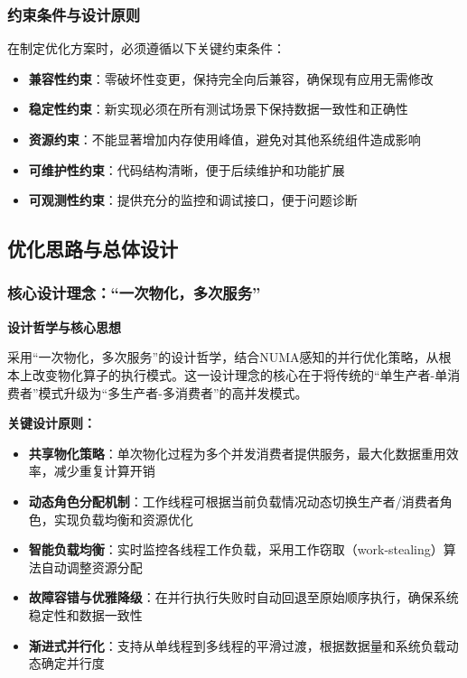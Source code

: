 \subsubsection{约束条件与设计原则}

在制定优化方案时，必须遵循以下关键约束条件：

\begin{itemize}
    \item \textbf{兼容性约束}：零破坏性变更，保持完全向后兼容，确保现有应用无需修改
    \item \textbf{稳定性约束}：新实现必须在所有测试场景下保持数据一致性和正确性
    \item \textbf{资源约束}：不能显著增加内存使用峰值，避免对其他系统组件造成影响
    \item \textbf{可维护性约束}：代码结构清晰，便于后续维护和功能扩展
    \item \textbf{可观测性约束}：提供充分的监控和调试接口，便于问题诊断
\end{itemize}

\subsection{优化思路与总体设计}

\subsubsection{核心设计理念：“一次物化，多次服务”}

\textbf{设计哲学与核心思想}

采用“一次物化，多次服务”的设计哲学，结合NUMA感知的并行优化策略\cite{numa2020optimization}，从根本上改变物化算子的执行模式。这一设计理念的核心在于将传统的“单生产者-单消费者”模式升级为“多生产者-多消费者”的高并发模式。

\textbf{关键设计原则：}

\begin{itemize}
    \item \textbf{共享物化策略}：单次物化过程为多个并发消费者提供服务，最大化数据重用效率，减少重复计算开销
    \item \textbf{动态角色分配机制}：工作线程可根据当前负载情况动态切换生产者/消费者角色，实现负载均衡和资源优化
    \item \textbf{智能负载均衡}：实时监控各线程工作负载，采用工作窃取（work-stealing）算法自动调整资源分配
    \item \textbf{故障容错与优雅降级}：在并行执行失败时自动回退至原始顺序执行，确保系统稳定性和数据一致性
    \item \textbf{渐进式并行化}：支持从单线程到多线程的平滑过渡，根据数据量和系统负载动态确定并行度
\end{itemize}


